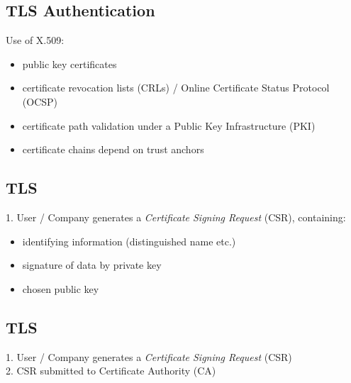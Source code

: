 \documentclass[xga]{xdvislides}
\begin{document}
% 
% 
% 
% 
% 
 
\subsection{TLS Authentication}
Use of X.509:
\begin{itemize}
	\item public key certificates
	\item certificate revocation lists (CRLs) / Online Certificate Status Protocol (OCSP)
	\item certificate path validation under a Public Key Infrastructure (PKI)
	\item certificate chains depend on trust anchors
\end{itemize}

\subsection{TLS}
1. User / Company generates a {\em Certificate Signing Request} (CSR),
containing:

\begin{itemize}
	\item identifying information (distinguished name etc.)
	\item signature of data by private key
	\item chosen public key
\end{itemize}

\subsection{TLS}
1. User / Company generates a {\em Certificate Signing Request} (CSR) \\

2. CSR submitted to Certificate Authority (CA) \\
\end{document}

